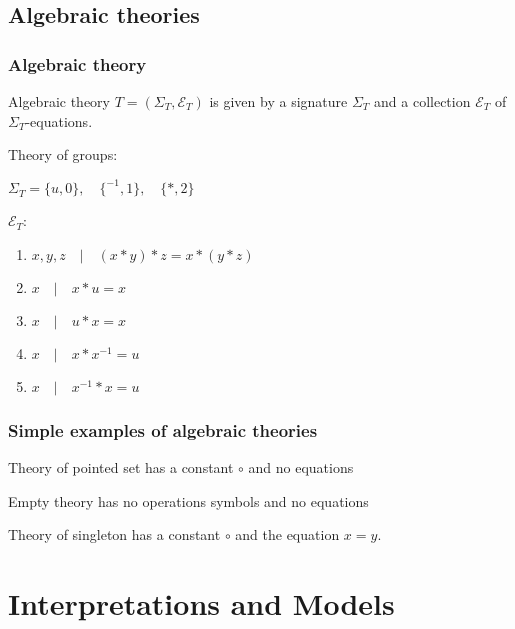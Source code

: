 \documentclass{beamer}
\begin{document}
\subsection{Algebraic theories}
\begin{frame}
    \frametitle{Algebraic theory}
    \begin{definition}
        Algebraic theory $T = (\Sigma_T, \mathcal{E}_T)$ is given by a signature
        $\Sigma_T$ and a collection $\mathcal{E}_T$ of $\Sigma_T$-equations.
    \end{definition}
    \begin{example}{Theory of groups:}
        

        $\Sigma_T = \{ u, 0 \}, \quad \{ ^{-1}, 1 \}, \quad \{ *, 2 \} $

        $\mathcal{E}_T$:
        \begin{enumerate}
            \item $x, y, z \quad |\quad (x * y) * z = x * (y * z)$
            \item $x \quad | \quad x * u = x$
            \item $x \quad |\quad u * x = x$
            \item $x \quad| \quad x * x^{-1} = u$
            \item $x \quad | \quad x^{-1} * x = u$
        \end{enumerate}
    \end{example}

\end{frame}
\begin{frame}
    \frametitle{Simple examples of algebraic theories}

    \begin{example}
        Theory of pointed set has a constant $\circ$ and no equations
    \end{example}


    \begin{example}
        Empty theory has no operations symbols and no equations 
    \end{example}


    \begin{example}
        Theory of singleton has a constant $\circ$ and the equation $x = y$.
    \end{example}

\end{frame}

\section{Interpretations and Models}
\end{document}
